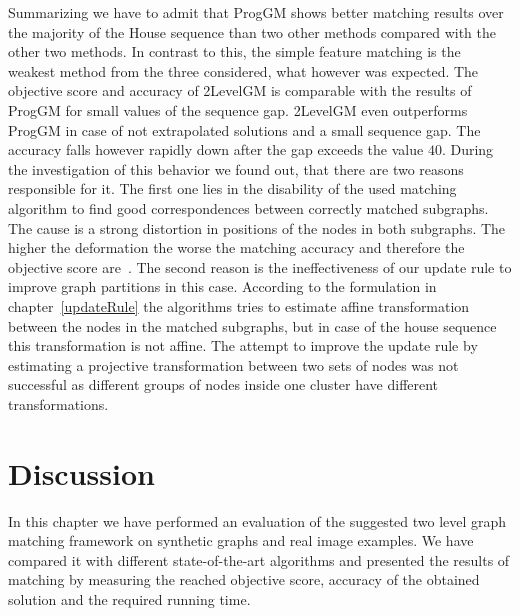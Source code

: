 Summarizing we have to admit that ProgGM shows better matching results over the majority of the House sequence than two other methods compared with the other two methods. In contrast to this, the simple feature matching is the weakest method from the three considered, what however was expected. The objective score and accuracy of 2LevelGM is comparable with the results of ProgGM for small values of the sequence gap. 2LevelGM even outperforms ProgGM in case of not extrapolated solutions and a small sequence gap. The accuracy falls however rapidly down after the gap exceeds the value $40$. During the investigation of this behavior we found out, that there are two reasons responsible for it. The first one lies in the disability of the used matching algorithm to find good correspondences between correctly matched subgraphs. The cause is a strong distortion in positions of the nodes in both subgraphs. The higher the deformation the worse the matching accuracy and therefore the objective score are~\cite{Cho2010_RRWM}.
The second reason is the ineffectiveness of our update rule to improve graph partitions in this case. According to the formulation in chapter~\ref{updateRule} the algorithms tries to estimate affine transformation between the nodes in the matched subgraphs, but in case of the house sequence this transformation is not affine. The attempt to improve the update rule by estimating a projective transformation between two sets of nodes was not successful as different groups of nodes inside one cluster have different transformations.

\FloatBarrier


\section{Discussion}

In this chapter we have performed an evaluation of the suggested two level graph matching framework on synthetic graphs and real image examples. We have compared it with different state-of-the-art algorithms and presented the results of matching by measuring the reached objective score, accuracy of the obtained solution and the required running time.

